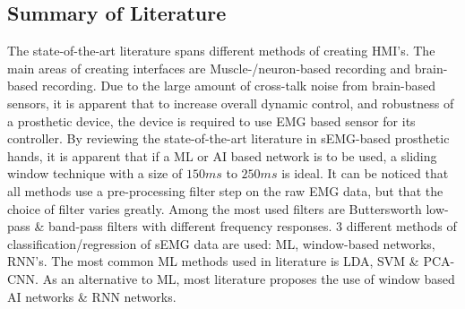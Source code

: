 \documentclass[../main.tex]{subfiles}
\begin{document}

\newpage
\subsection{Summary of Literature}

The state-of-the-art literature spans different methods of creating \gls{HMI}'s.
The main areas of creating interfaces are Muscle-/neuron-based recording and brain-based recording.
Due to the large amount of cross-talk noise from brain-based sensors, it is apparent that to increase overall dynamic control, and robustness of a prosthetic device, the device is required to use \gls{EMG} based sensor for its controller.
By reviewing the state-of-the-art literature in \gls{sEMG}-based prosthetic hands, it is apparent that if a \gls{ML} or \gls{AI} based network is to be used, a sliding window technique with a size of $150ms$ to $250ms$ is ideal.
It can be noticed that all methods use a pre-processing filter step on the raw \gls{EMG} data, but that the choice of filter varies greatly.
Among the most used filters are Buttersworth low-pass \& band-pass filters with different frequency responses.
3 different methods of classification/regression of \gls{sEMG} data are used: \gls{ML}, window-based networks, \gls{RNN}'s.
The most common \gls{ML} methods used in literature is \gls{LDA}, \gls{SVM} \& PCA-CNN.
As an alternative to \gls{ML}, most literature proposes the use of window based \gls{AI} networks \& \gls{RNN} networks.
\end{document}
